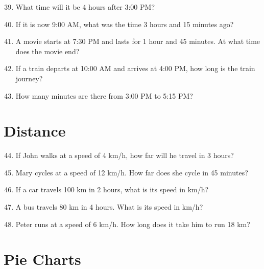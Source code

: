\documentclass[10pt,a4paper]{article}
\begin{document}
\begin{enumerate}
\setcounter{enumi}{38}
\item What time will it be 4 hours after 3:00 PM?
\item If it is now 9:00 AM, what was the time 3 hours and 15 minutes ago?
\item A movie starts at 7:30 PM and lasts for 1 hour and 45 minutes. At what time does the movie end?
\item If a train departs at 10:00 AM and arrives at 4:00 PM, how long is the train journey?
\item How many minutes are there from 3:00 PM to 5:15 PM?
\end{enumerate}

\section*{Distance}

\begin{enumerate}
\setcounter{enumi}{43}
\item If John walks at a speed of 4 km/h, how far will he travel in 3 hours?
\item Mary cycles at a speed of 12 km/h. How far does she cycle in 45 minutes?
\item If a car travels 100 km in 2 hours, what is its speed in km/h?
\item A bus travels 80 km in 4 hours. What is its speed in km/h?
\item Peter runs at a speed of 6 km/h. How long does it take him to run 18 km?
\end{enumerate}

\section*{Pie Charts}
\end{document}
